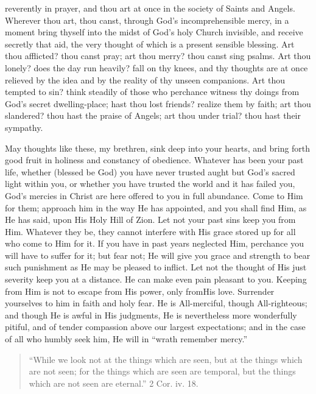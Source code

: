 reverently in prayer, and thou art at once in the society of Saints
and Angels. Wherever thou art, thou canst, through God's
incomprehensible mercy, in a moment bring thyself into the midst of
God's holy Church invisible, and receive secretly that aid, the very
thought of which is a present sensible blessing. Art thou afflicted?
thou canst pray; art thou merry? thou canst sing psalms. Art thou
lonely? does the day run heavily? fall on thy knees, and thy thoughts
are at once relieved by the idea and by the reality of thy unseen
companions. Art thou tempted to sin? think steadily of those who
perchance witness thy doings from God's secret dwelling-place; hast
thou lost friends? realize them by faith; art thou slandered? thou
hast the praise of Angels; art thou under trial? thou hast their
sympathy.

May thoughts like these, my brethren, sink deep into your hearts,
and bring forth good fruit in holiness and constancy of obedience.
Whatever has been your past life, whether (blessed be God) you have
never trusted aught but God's sacred light within you, or whether you
have trusted the world and it has failed you, God's mercies in Christ
are here offered to you in full abundance. Come to Him for them;
approach him in the way He has appointed, and you shall find Him, as
He has said, upon His Holy Hill of Zion. Let not your past sins keep
you from Him. Whatever they be, they cannot interfere with His grace
stored up for all who come to Him for it. If you have in past years
neglected Him, perchance you will have to suffer for it; but fear not;
He will give you grace and strength to bear such punishment as He may
be pleased to inflict. Let not the thought of His just severity keep
you at a distance. He can make even pain pleasant to you. Keeping from
Him is not to escape from His power, only from\emph{}His love.
Surrender yourselves to him in faith and holy fear. He is
All-merciful, though All-righteous; and though He is awful in His
judgments, He is nevertheless more wonderfully pitiful, and of tender
compassion above our largest expectations; and in the case of all who
humbly seek him, He will in ``wrath remember mercy.''


\begin{quote}

``While we look not at the things which are seen, but at the
things which are not seen; for the things which are seen are
temporal, but the things which are not seen are eternal.'' 2 Cor.
iv. 18.

\end{quote}

